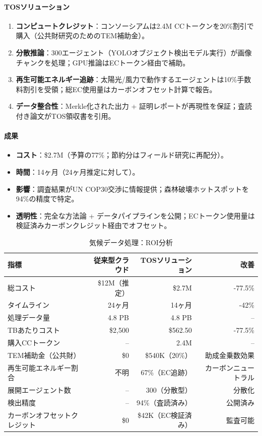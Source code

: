 \documentclass[11pt]{article}
\begin{document}
\paragraph{TOSソリューション}
\begin{enumerate}[noitemsep]
  \item \textbf{コンピュートクレジット}：コンソーシアムは2.4M CCトークンを20\%割引で購入（公共財研究のためのTEM補助金）。
  \item \textbf{分散推論}：300エージェント（YOLOオブジェクト検出モデル実行）が画像チャンクを処理；GPU推論はECトークン経由で補助。
  \item \textbf{再生可能エネルギー追跡}：太陽光/風力で動作するエージェントは10\%手数料割引を受領；総EC使用量はカーボンオフセット計算で報告。
  \item \textbf{データ整合性}：Merkle化された出力 + 証明レポートが再現性を保証；査読付き論文がTOS領収書を引用。
\end{enumerate}

\paragraph{成果}
\begin{itemize}[noitemsep]
  \item \textbf{コスト}：\$2.7M（予算の77\%；節約分はフィールド研究に再配分）。
  \item \textbf{時間}：14ヶ月（24ヶ月推定に対して）。
  \item \textbf{影響}：調査結果がUN COP30交渉に情報提供；森林破壊ホットスポットを94\%の精度で特定。
  \item \textbf{透明性}：完全な方法論 + データパイプラインを公開；ECトークン使用量は検証済みカーボンクレジット経由でオフセット。
\end{itemize}

\begin{table}[H]
\centering
\caption{気候データ処理：ROI分析}
\label{tab:climate-roi}
\begin{tabular}{@{}lrrr@{}}
\toprule
\textbf{指標} & \textbf{従来型クラウド} & \textbf{TOSソリューション} & \textbf{改善} \\ \midrule
総コスト & \$12M（推定） & \$2.7M & -77.5\% \\
タイムライン & 24ヶ月 & 14ヶ月 & -42\% \\
処理データ量 & 4.8 PB & 4.8 PB & -- \\
TBあたりコスト & \$2,500 & \$562.50 & -77.5\% \\
購入CCトークン & -- & 2.4M & -- \\
TEM補助金（公共財） & \$0 & \$540K（20\%） & 助成金乗数効果 \\
再生可能エネルギー割合 & 不明 & 67\%（EC追跡） & カーボンニュートラル \\
展開エージェント数 & -- & 300（分散型） & 分散化 \\
検出精度 & -- & 94\%（査読済み） & 公開済み \\
カーボンオフセットクレジット & \$0 & \$42K（EC検証済み） & 監査可能 \\
\bottomrule
\end{tabular}
\end{table}
\end{document}
